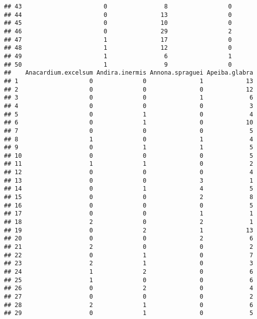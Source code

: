 \documentclass[
]{article}
\begin{document}
\begin{verbatim}
## 43                       0                8                 0
## 44                       0               13                 0
## 45                       0               10                 0
## 46                       0               29                 2
## 47                       1               17                 0
## 48                       1               12                 0
## 49                       1                6                 1
## 50                       1                9                 0
##    Anacardium.excelsum Andira.inermis Annona.spraguei Apeiba.glabra
## 1                    0              0               1            13
## 2                    0              0               0            12
## 3                    0              0               1             6
## 4                    0              0               0             3
## 5                    0              1               0             4
## 6                    0              1               0            10
## 7                    0              0               0             5
## 8                    1              0               1             4
## 9                    0              1               1             5
## 10                   0              0               0             5
## 11                   1              1               0             2
## 12                   0              0               0             4
## 13                   0              0               3             1
## 14                   0              1               4             5
## 15                   0              0               2             8
## 16                   0              0               0             5
## 17                   0              0               1             1
## 18                   2              0               2             1
## 19                   0              2               1            13
## 20                   0              0               2             6
## 21                   2              0               0             2
## 22                   0              1               0             7
## 23                   2              1               0             3
## 24                   1              2               0             6
## 25                   1              0               0             6
## 26                   0              2               0             4
## 27                   0              0               0             2
## 28                   2              1               0             6
## 29                   0              1               0             5

\end{verbatim}
\end{document}
